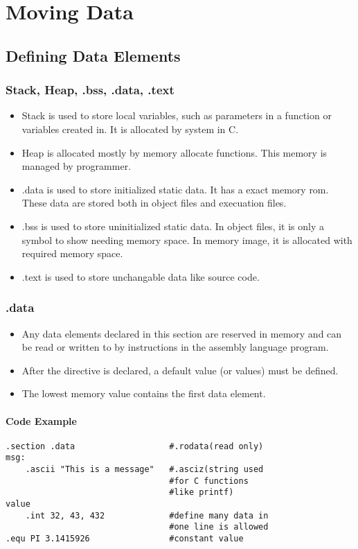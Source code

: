 \chapter{Moving Data}



\section{Defining Data Elements}


\subsection{Stack, Heap, .bss, .data, .text}
\begin{itemize}
    \item Stack is used to store local variables, such as parameters in a function or variables created in{}. It is allocated by system in C.
    \item Heap is allocated mostly by memory allocate functions. This memory is managed by programmer.
    \item .data is used to store initialized static data. It has a exact memory rom. These data are stored both in object files and execuation files.
    \item .bss is used to store uninitialized static data. In object files, it is only a symbol to show needing memory space. In memory image, it is allocated with required memory space.
    \item .text is used to store unchangable data like source code.
\end{itemize}
\subsection{.data}
\begin{itemize}
    \item Any data elements declared in this section are reserved in memory and can be read or written to by instructions in the assembly language program.
    \item After the directive is declared, a default value (or values) must be defined.
    \item The lowest memory value contains the first data element.
\end{itemize}

\subsubsection{Code Example}
\begin{lstlisting}
.section .data                   #.rodata(read only)
msg:
    .ascii "This is a message"   #.asciz(string used 
                                 #for C functions 
                                 #like printf)
value
    .int 32, 43, 432             #define many data in
                                 #one line is allowed
.equ PI 3.1415926                #constant value
\end{lstlisting}



